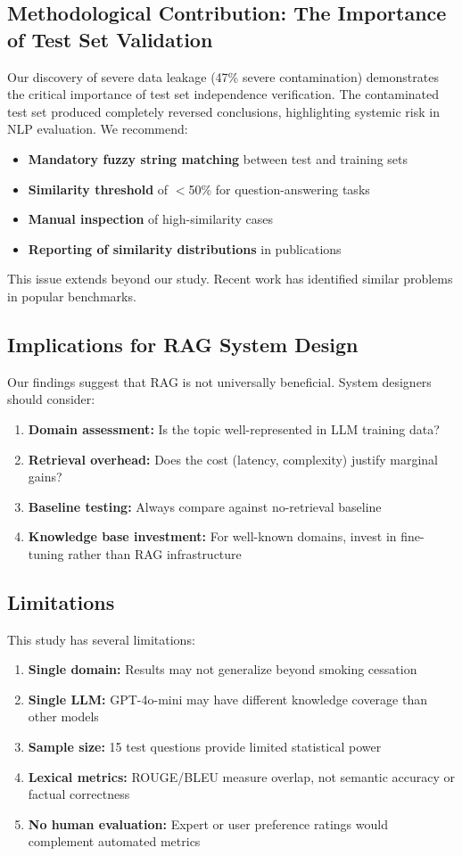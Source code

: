\documentclass[10pt,letterpaper]{article}
\begin{document}
\subsection*{Methodological Contribution: The Importance of Test Set Validation}
Our discovery of severe data leakage (47\% severe contamination) demonstrates the critical importance of test set independence verification. The contaminated test set produced completely reversed conclusions, highlighting systemic risk in NLP evaluation. We recommend:
\begin{itemize}
    \item \textbf{Mandatory fuzzy string matching} between test and training sets
    \item \textbf{Similarity threshold} of $<$50\% for question-answering tasks
    \item \textbf{Manual inspection} of high-similarity cases
    \item \textbf{Reporting of similarity distributions} in publications
\end{itemize}

This issue extends beyond our study. Recent work has identified similar problems in popular benchmarks\cite{lewis2021questionanswering, dodge2021documenting}.

\subsection*{Implications for RAG System Design}
Our findings suggest that RAG is not universally beneficial. System designers should consider:
\begin{enumerate}
    \item \textbf{Domain assessment:} Is the topic well-represented in LLM training data?
    \item \textbf{Retrieval overhead:} Does the cost (latency, complexity) justify marginal gains?
    \item \textbf{Baseline testing:} Always compare against no-retrieval baseline
    \item \textbf{Knowledge base investment:} For well-known domains, invest in fine-tuning rather than RAG infrastructure
\end{enumerate}

\subsection*{Limitations}
This study has several limitations:
\begin{enumerate}
    \item \textbf{Single domain:} Results may not generalize beyond smoking cessation
    \item \textbf{Single LLM:} GPT-4o-mini may have different knowledge coverage than other models
    \item \textbf{Sample size:} 15 test questions provide limited statistical power
    \item \textbf{Lexical metrics:} ROUGE/BLEU measure overlap, not semantic accuracy or factual correctness
    \item \textbf{No human evaluation:} Expert or user preference ratings would complement automated metrics
\end{enumerate}
\end{document}
